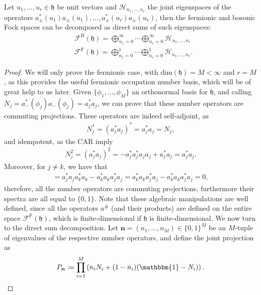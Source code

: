 \begin{proposition}
	\label{occupation-number-basis}
	Let $u_1,\ldots,u_r\in\mathfrak{h}$ be unit vectors and $\mathcal{H}_{n_1,\ldots,n_r}$
	the joint eigenspaces of the operators
	$a^*_\pm(u_1)a_\pm(u_1),\ldots,a^*_\pm(u_r)a_\pm(u_r)$, then the fermionic and bosonic
	Fock spaces can be decomposed as direct sums of such eigenspaces:
	\begin{align*}
		&\mathcal{F}^\mathrm{B}(\mathfrak{h}) =
		\bigoplus_{n_1=0}^\infty\cdots\bigoplus_{n_r=0}^\infty\mathcal{H}_{n_1,\ldots,n_r}\\
		&\mathcal{F}^\mathrm{F}(\mathfrak{h}) =
		\bigoplus_{n_1=0}^1\cdots\bigoplus_{n_r=0}^1\mathcal{H}_{n_1,\ldots,n_r}.
	\end{align*}
\end{proposition}
\begin{proof}
	We will only prove the fermionic case, with $\mathrm{dim}(\mathfrak{h})=M<\infty$ and
	$r=M$, as this provides the useful fermionic occupation number basis, which will be of
	great help to us later. Given $\{\phi_1,\ldots,\phi_M\}$ an orthonormal basis for
	$\mathfrak{h}$, and calling $N_j = a^*_-(\phi_j)a_-(\phi_j) = a^*_ja_j$, we can prove that
	these number operators are commuting projections. These operators are indeed self-adjoint, as
	\begin{align*}
		N_j^* = (a^*_ja_j)^* = a^*_ja_j = N_j,
	\end{align*}
	and idempotent, as the CAR imply
	\begin{align*}
		N_j^2 = (a^*_ja_j)^2 = - a^*_ja^*_ja_ja_j + a^*_ja_j = a^*_ja_j.
	\end{align*}
	Moreover, for $j\neq k$, we have that
	\begin{align*}
		[N_j, N_k] = a^*_ja_ja^*_ka_k - a^*_ka_ka^*_ja_j = a^*_ka_ka^*_ja_j - a^*_ka_ka^*_ja_j = 0,
	\end{align*}
	therefore, all the number operators are commuting projections, furthermore their spectra
	are all equal to $\{0,1\}$. Note that these algebraic manipulations are well defined,
	since all the operators $a^\#$ (and their products) are defined on the entire space
	$\mathcal{F}^\text{F}(\mathfrak{h})$, which is finite-dimensional if $\mathfrak{h}$ is
	finite-dimensional. We now turn to the direct sum decomposition. Let
	$\boldsymbol{n}=(n_1,\ldots,n_M)\in\{0,1\}^M$ be an $M$-tuple of eigenvalues of the
	respective number operators, and define the joint projection as
	\begin{align*}
		P_{\boldsymbol{n}} \coloneq \prod_{i=1}^M\left(n_i N_i + (1-n_i)(\mathbbm{1}-N_i)\right).

\end{align*}
\end{proof}
